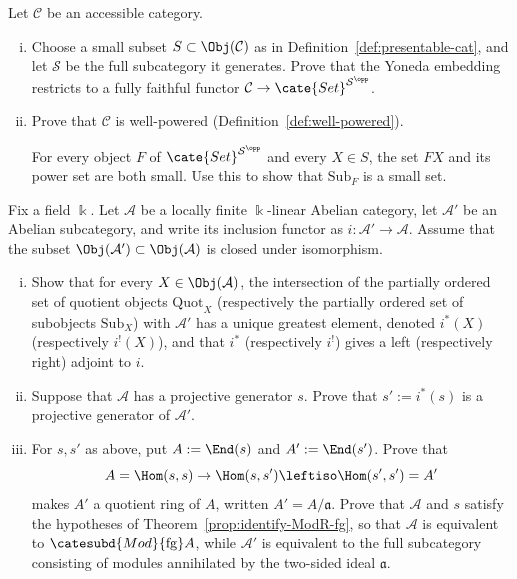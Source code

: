 \begin{Exercises}
	\item Let $\mathcal{C}$ be an accessible category.
	\begin{enumerate}[(i)]
		\item Choose a small subset $S\subset\Obj(\mathcal{C})$ as in Definition~\ref{def:presentable-cat}, and let $\mathcal{S}$ be the full subcategory it generates. Prove that the Yoneda embedding restricts to a fully faithful functor
		$\mathcal{C}\to\cate{Set}^{\mathcal{S}^{\opp}}$.
		\item Prove that $\mathcal{C}$ is well-powered (Definition~\ref{def:well-powered}).
		\begin{hint}
			For every object $F$ of $\cate{Set}^{\mathcal{S}^{\opp}}$ and every $X\in S$, the set $FX$ and its power set are both small. Use this to show that $\mathrm{Sub}_F$ is a small set.
		\end{hint}
	\end{enumerate}

	\item Fix a field $\Bbbk$. Let $\mathcal{A}$ be a locally finite $\Bbbk$-linear Abelian category, let $\mathcal{A}'$ be an Abelian subcategory, and write its inclusion functor as $i:\mathcal{A}'\to\mathcal{A}$. Assume that the subset $\Obj(\mathcal{A}')\subset\Obj(\mathcal{A})$ is closed under isomorphism.
	\begin{enumerate}[(i)]
		\item Show that for every $X\in\Obj(\mathcal{A})$, the intersection of the partially ordered set of quotient objects $\mathrm{Quot}_X$ (respectively the partially ordered set of subobjects $\mathrm{Sub}_X$) with $\mathcal{A}'$ has a unique greatest element, denoted $i^*(X)$ (respectively $i^!(X)$), and that $i^*$ (respectively $i^!$) gives a left (respectively right) adjoint to $i$.
		\item Suppose that $\mathcal{A}$ has a projective generator $s$. Prove that $s':=i^*(s)$ is a projective generator of $\mathcal{A}'$.
		\item For $s,s'$ as above, put $A:=\End(s)$ and $A':=\End(s')$. Prove that
		\[ A = \Hom(s, s) \to \Hom(s, s') \leftiso \Hom(s', s') = A' \]
		makes $A'$ a quotient ring of $A$, written $A'=A/\mathfrak{a}$. Prove that $\mathcal{A}$ and $s$ satisfy the hypotheses of Theorem~\ref{prop:identify-ModR-fg}, so that $\mathcal{A}$ is equivalent to $\catesubd{Mod}{\mathrm{fg}}A$, while $\mathcal{A}'$ is equivalent to the full subcategory consisting of modules annihilated by the two-sided ideal $\mathfrak{a}$.
	\end{enumerate}
\end{Exercises}
